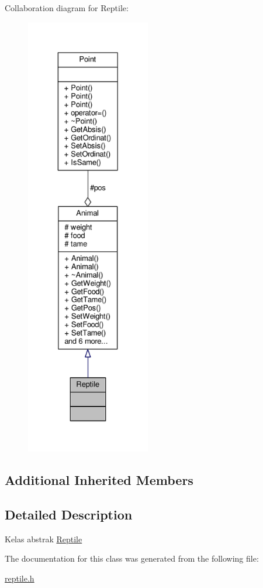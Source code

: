 Collaboration diagram for Reptile\+:
\nopagebreak
\begin{figure}[H]
\begin{center}
\leavevmode
\includegraphics[height=550pt]{classReptile__coll__graph}
\end{center}
\end{figure}
\subsection*{Additional Inherited Members}


\subsection{Detailed Description}
Kelas abstrak \hyperlink{classReptile}{Reptile} 

The documentation for this class was generated from the following file\+:\begin{DoxyCompactItemize}
\item 
\hyperlink{reptile_8h}{reptile.\+h}\end{DoxyCompactItemize}
